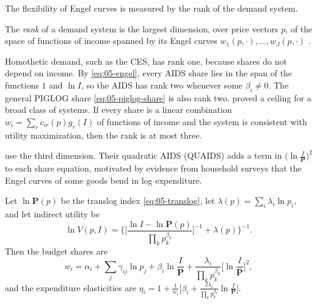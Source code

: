 The flexibility of Engel curves is measured by the rank of the demand system.

\begin{definition}[Rank]\label{def:05-rank}
The \emph{rank} of a demand system is the largest dimension, over price vectors $p$, of the space of functions
of income spanned by its Engel curves $w_1(p, \cdot), \dots, w_J(p, \cdot)$ \citep{Lewbel1991}.
\end{definition}

Homothetic demand, such as the CES, has rank one, because shares do not depend on income. By
\eqref{eq:05-engel}, every AIDS share lies in the span of the functions $1$ and $\ln I$, so the AIDS has rank
two whenever some $\beta_i \neq 0$. The general PIGLOG share \eqref{eq:05-piglog-share} is also rank two.
\citet{Gorman1981} proved a ceiling for a broad class of systems. If every share is a linear combination
$w_i = \sum_rc_{ir}(p)g_r(I)$ of functions of income and the system is consistent with utility maximization,
then the rank is at most three.

\citet{BanksBlundellLewbel1997} use the third dimension. Their quadratic AIDS (QUAIDS) adds a term in
$\big(\ln\frac{I}{\mathbf{P}}\big)^2$ to each share equation, motivated by evidence from household surveys
that the Engel curves of some goods bend in log expenditure.

\begin{proposition}\label{prop:05-quaids}
Let $\ln\mathbf{P}(p)$ be the translog index \eqref{eq:05-translog}, let $\lambda(p) = \sum_i\lambda_i\ln p_i$,
and let indirect utility be
\begin{equation}\label{eq:05-quaids-v}
\ln V(p, I) = \Bigg\{\bigg[\frac{\ln I - \ln\mathbf{P}(p)}{\prod_kp_k^{\beta_k}}\bigg]^{-1} + \lambda(p)\Bigg\}^{-1} .
\end{equation}
Then the budget shares are
\begin{equation}\label{eq:05-quaids-share}
w_i = \alpha_i + \sum_j\gamma_{ij}\ln p_j + \beta_i\ln\frac{I}{\mathbf{P}} +
\frac{\lambda_i}{\prod_kp_k^{\beta_k}}\Big[\ln\frac{I}{\mathbf{P}}\Big]^2 ,
\end{equation}
and the expenditure elasticities are
$\eta_i = 1 + \frac{1}{w_i}\Big[\beta_i + \frac{2\lambda_i}{\prod_kp_k^{\beta_k}}\ln\frac{I}{\mathbf{P}}\Big]$.
\end{proposition}

